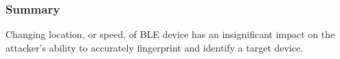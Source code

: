 \subsubsection*{Summary} 
Changing location, or speed, of BLE device has an insignificant impact on the
attacker's ability to accurately fingerprint and identify a target device.
    
    
